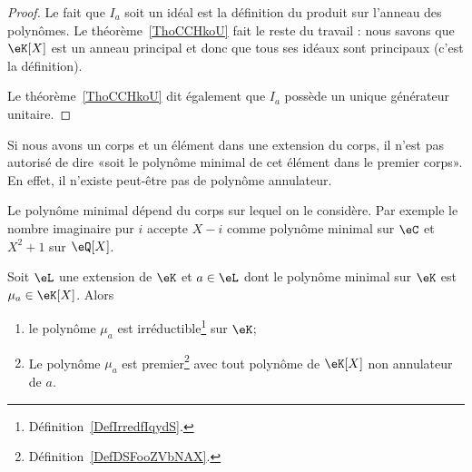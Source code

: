 \begin{proof}
    Le fait que \( I_a\) soit un idéal est la définition du produit sur l'anneau des polynômes. Le théorème~\ref{ThoCCHkoU} fait le reste du travail : nous savons que \( \eK[X]\) est un anneau principal et donc que tous ses idéaux sont principaux (c'est la définition).

    Le théorème~\ref{ThoCCHkoU} dit également que \( I_a\) possède un unique générateur unitaire.
\end{proof}

Si nous avons un corps et un élément dans une extension du corps, il n'est pas autorisé de dire «soit le polynôme minimal de cet élément dans le premier corps». En effet, il n'existe peut-être pas de polynôme annulateur.

\begin{example}
    Le polynôme minimal dépend du corps sur lequel on le considère. Par exemple le nombre imaginaire pur \( i\) accepte \( X-i\) comme polynôme minimal sur \( \eC\) et \( X^2+1\) sur \( \eQ[X]\).
\end{example}

\begin{proposition}  \label{PropRARooKavaIT}
    Soit \( \eL\) une extension de \( \eK\) et \( a\in \eL\) dont le polynôme minimal sur \( \eK\) est \( \mu_a\in\eK[X]\). Alors
    \begin{enumerate}
        \item   \label{ItemDOQooYpLvXri}
            le polynôme \( \mu_a\) est irréductible\footnote{Définition~\ref{DefIrredfIqydS}.} sur \( \eK\);
        \item
            Le polynôme \( \mu_a\) est premier\footnote{Définition~\ref{DefDSFooZVbNAX}.} avec tout polynôme de \( \eK[X]\) non annulateur de \( a\).
    \end{enumerate}
\end{proposition}

